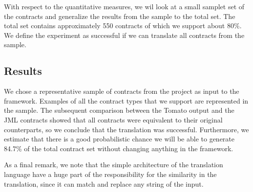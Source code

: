 With respect to the quantitative measures, we wil look at a small samplet set of the contracts and generalize the results from the sample to the total set. The total set contains approximately 550 contracts of which we support about 80\%. We define the experiment as successful if we can translate all contracts from the sample.

\subsection{Results}

We chose a representative sample of contracts from the project as input to the framework. Examples of all the contract types that we support are represented in the sample. The subsequent comparison between the Tomato output and the JML contracts showed that all contracts were equivalent to their original counterparts, so we conclude that the translation was successful. Furthermore, we estimate that there is a good probabilistic chance we will be able to generate 84.7\% of the total contract set without changing anything in the framework.
	
As a final remark, we note that the simple architecture of the translation language have a huge part of the responsibility for the similarity in the translation, since it can match and replace any string of the input.






